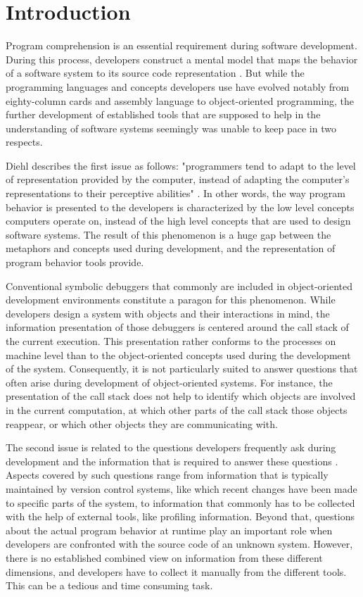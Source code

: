 \chapter{Introduction}
\label{c:introduction}

Program comprehension is an essential requirement during software development.
During this process, developers construct a mental model that maps the behavior of a software system to its source code representation \cite{latoza_maintaining_2006}.
But while the programming languages and concepts developers use have evolved notably from eighty-column cards and assembly language to object-oriented programming, the further development of established tools that are supposed to help in the understanding of software systems seemingly was unable to keep pace in two respects.

Diehl describes the first issue as follows: "programmers tend to adapt to the level of representation provided by the computer, instead of adapting the computer's representations to their perceptive abilities" \cite{diehl_software_2007}.
In other words, the way program behavior is presented to the developers is characterized by the low level concepts computers operate on, instead of the high level concepts that are used to design software systems.
The result of this phenomenon is a huge gap between the metaphors and concepts used during development, and the representation of program behavior tools provide.

Conventional symbolic debuggers that commonly are included in object-oriented development environments constitute a paragon for this phenomenon.
While developers design a system with objects and their interactions in mind, the information presentation of those debuggers is centered around the call stack of the current execution.
This presentation rather conforms to the processes on machine level than to the object-oriented concepts used during the development of the system.
Consequently, it is not particularly suited to answer questions that often arise during development of object-oriented systems.
For instance, the presentation of the call stack does not help to identify which objects are involved in the current computation, at which other parts of the call stack those objects reappear, or which other objects they are communicating with.

The second issue is related to the questions developers frequently ask during development and the information that is required to answer these questions \cite{sillito_asking_2008, latoza_hard--answer_2010, abi-antoun_questions_2010}.
Aspects covered by such questions range from information that is typically maintained by version control systems, like which recent changes have been made to specific parts of the system, to information that commonly has to be collected with the help of external tools, like profiling information.
Beyond that, questions about the actual program behavior at runtime play an important role when developers are confronted with the source code of an unknown system.
However, there is no established combined view on information from these different dimensions, and developers have to collect it manually from the different tools.
This can be a tedious and time consuming task.

